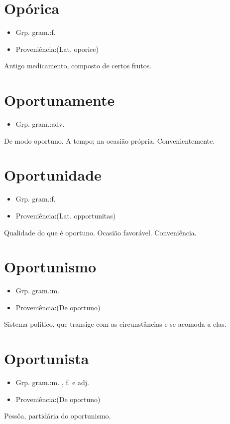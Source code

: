 \section{Opórica}
\begin{itemize}
\item {Grp. gram.:f.}
\end{itemize}
\begin{itemize}
\item {Proveniência:(Lat. \textunderscore oporice\textunderscore )}
\end{itemize}
Antigo medicamento, composto de certos frutos.
\section{Oportunamente}
\begin{itemize}
\item {Grp. gram.:adv.}
\end{itemize}
De modo oportuno.
A tempo; na ocasião própria.
Convenientemente.
\section{Oportunidade}
\begin{itemize}
\item {Grp. gram.:f.}
\end{itemize}
\begin{itemize}
\item {Proveniência:(Lat. \textunderscore opportunitas\textunderscore )}
\end{itemize}
Qualidade do que é oportuno.
Ocasião favorável.
Conveniência.
\section{Oportunismo}
\begin{itemize}
\item {Grp. gram.:m.}
\end{itemize}
\begin{itemize}
\item {Proveniência:(De \textunderscore oportuno\textunderscore )}
\end{itemize}
Sistema político, que transige com as circunstâncias e se acomoda a elas.
\section{Oportunista}
\begin{itemize}
\item {Grp. gram.:m. ,  f.  e  adj.}
\end{itemize}
\begin{itemize}
\item {Proveniência:(De \textunderscore oportuno\textunderscore )}
\end{itemize}
Pessôa, partidária do oportunismo.

